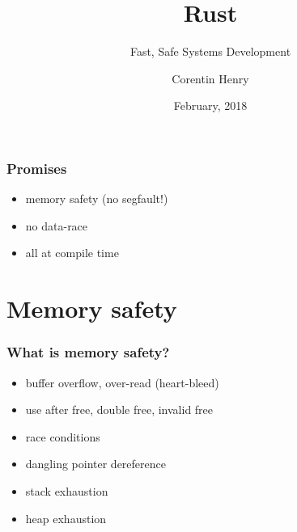 \documentclass{beamer}
\begin{document}
{%
    \title{Rust}
    \subtitle{Fast, Safe Systems Development}
    \author{Corentin Henry}
    \date{February, 2018}
    \frame{\titlepage}
}
\addtocounter{framenumber}{-2}

\begin{frame}
    \frametitle{Promises}
    \begin{itemize}
        \item memory safety (no segfault!)
        \item no data-race
        \item all at compile time
    \end{itemize}
\end{frame}

\section{Memory safety}

\begin{frame}
    \frametitle{What is memory safety?}
    \begin{itemize}
        \item buffer overflow, over-read (heart-bleed)
        \item use after free, double free, invalid free
        \item race conditions
        \item dangling pointer dereference
        \item stack exhaustion
        \item heap exhaustion
    \end{itemize}
\end{frame}

\begin{frame}
    \begin{multicols}{2}
        \inputminted[fontsize=\scriptsize]{c}{code/vec1.c}
    \end{multicols}
\end{frame}

\begin{frame}
    \inputminted[fontsize=\scriptsize]{c}{code/vec2.c}
\end{frame}
\end{document}
